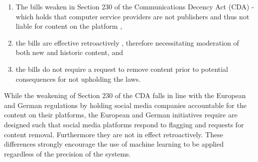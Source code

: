 \begin{enumerate}
  \item{The bills weaken \citep{Romano:2018,Stryker:2018} in Section 230 of the Communications Decency Act (CDA) - which holds that computer service providers are not publishers and thus not liable for content on the platform \citep{EFF:230},}
  \item{the bills are effective retroactively \citep{Stryker:2018}, therefore necessitating moderation of both new and historic content, and}
  \item{the bills do not require a request to remove content prior to potential consequences for not upholding the laws.}
\end{enumerate}

While the weakening of Section 230 of the CDA falls in line with the European and German regulations by holding social media companies accountable for the content on their platforms, the European and German initiatives require are designed such that social media platforms respond to flagging and requests for content removal. Furthermore they are not in effect retroactively. These differences strongly encourage the use of machine learning to be applied regardless of the precision of the systems.\vspace{5mm}

